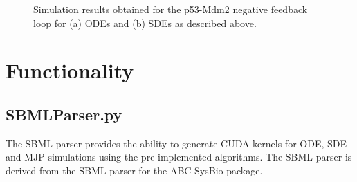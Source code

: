 \documentclass [11pt, a4paper, openany, twoside=off] {article}
\begin{document}
\begin{figure}[h!]%
	\centering
	\caption{Simulation results obtained for the p53-Mdm2 negative feedback loop for (a) ODEs and (b) SDEs as described above.}
	\label{fig:ex_p53}
\end{figure}

\newpage
\section{Functionality}
\subsection{SBMLParser.py}
The SBML parser provides the ability to generate CUDA kernels for ODE, SDE and MJP simulations using the pre-implemented algorithms. The SBML parser is derived from the SBML parser for the ABC-SysBio package. %
\end{document}

